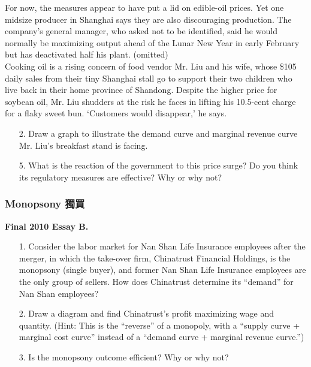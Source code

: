 \documentclass[12pt, xcolor=dvipsnames]{beamer}
\begin{document}
\begin{frame}
\small 
For now, the measures appear to have put a lid on edible-oil prices. Yet one midsize producer in Shanghai says they are also discouraging production. The company's general manager, who asked not to be identified, said he would normally be maximizing output ahead of the Lunar New Year in early February but has deactivated half his plant. (omitted)\\
Cooking oil is a rising concern of food vendor Mr. Liu and his wife, whose \$105 daily sales from their tiny Shanghai stall go to support their two children who live back in their home province of Shandong. Despite the higher price for soybean oil, Mr. Liu shudders at the risk he faces in lifting his 10.5-cent charge for a flaky sweet bun. `Customers would disappear,' he says.
\end{frame}





\begin{frame}
\small 
\begin{enumerate}\itemsep-0.5ex 
\item[2.] Draw a graph to illustrate the demand curve and marginal revenue curve Mr. Liu’s breakfast stand is facing.
\item[5.] What is the reaction of the government to this price surge? Do you think its regulatory measures are effective? Why or why not?
\end{enumerate}
\end{frame}





\begin{frame}
\frametitle{\bf Monopsony 獨買}
\small \textsf{\bfseries Final 2010 Essay B.} \\
\begin{enumerate}\itemsep-0.5ex 
\item[1.] Consider the labor market for Nan Shan Life Insurance employees after the merger, in which the take-over firm, Chinatrust Financial Holdings, is the monopsony (single buyer), and former Nan Shan Life Insurance employees are the only group of sellers. How does Chinatrust determine its ``demand'' for Nan Shan employees?
\item[2.] Draw a diagram and find Chinatrust’s profit maximizing wage and quantity. (Hint: This is the ``reverse'' of a monopoly, with a ``supply curve + marginal cost curve'' instead of a ``demand curve + marginal revenue curve.'')
\item[3.] Is the monopsony outcome efficient? Why or why not?
\end{enumerate}
\end{frame}
\end{document}
